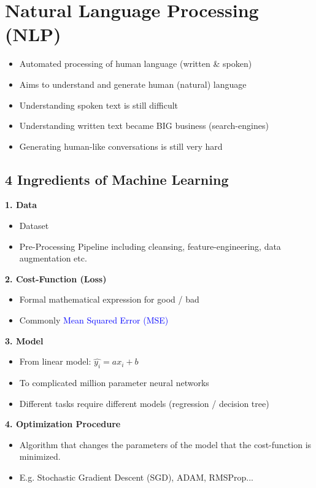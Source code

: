 \section{Natural Language Processing (NLP)}
\begin{itemize}
    \item Automated processing of human language (written \& spoken)
    \item Aims to understand and generate human (natural) language
    \item Understanding spoken text is still difficult
    \item Understanding written text became BIG business (search-engines)
    \item Generating human-like conversations is still very hard
\end{itemize}
\subsection{4 Ingredients of Machine Learning}
\textbf{1. Data}
\begin{itemize}
    \item Dataset
    \item Pre-Processing Pipeline including cleansing, feature-engineering, data augmentation etc.
\end{itemize}
\textbf{2. Cost-Function (Loss)}
\begin{itemize}
    \item Formal mathematical expression for good / bad
    \item Commonly \textcolor{blue}{Mean Squared Error (MSE)}
\end{itemize}
\textbf{3. Model}
\begin{itemize}
    \item From linear model: $\hat{y_i} = ax_i + b$
    \item To complicated million parameter neural networks
    \item Different tasks require different models (regression / decision tree)
\end{itemize}
\textbf{4. Optimization Procedure}
\begin{itemize}
    \item Algorithm that changes the parameters of the model that the cost-function is minimized.
    \item E.g. Stochastic Gradient Descent (SGD), ADAM, RMSProp...
\end{itemize}

